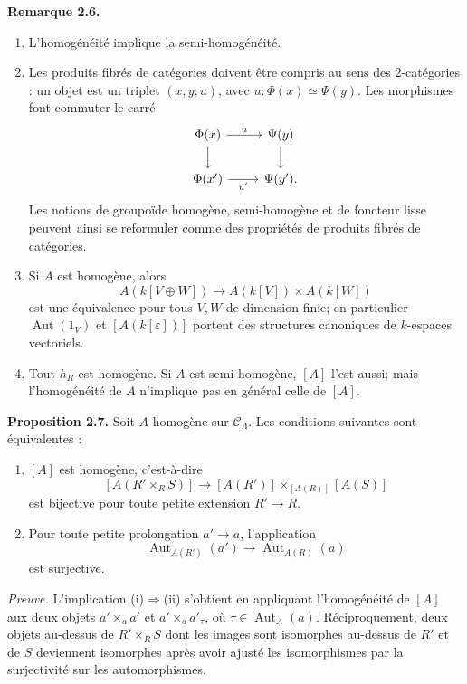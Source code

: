 \documentclass[11pt]{article}
\providecommand{\Aut}{\operatorname{Aut}}
\begin{document}
\textbf{Remarque 2.6.}
\begin{enumerate}[label=(\alph*)]
\item L'homog\'en\'eit\'e implique la semi-homog\'en\'eit\'e.

\item Les produits fibr\'es de cat\'egories doivent \^etre compris au sens des \(2\)-cat\'egories :
un objet est un triplet \((x,y;u)\), avec \(u:\Phi(x)\simeq\Psi(y)\). Les morphismes
font commuter le carr\'e
\[
\begin{tikzcd}
\Phi(x) \arrow[r,"u"] \arrow[d] & \Psi(y) \arrow[d]\\
\Phi(x') \arrow[r,"u'"'] & \Psi(y').
\end{tikzcd}
\]
Les notions de groupo\"ide homog\`ene, semi-homog\`ene et de foncteur lisse peuvent ainsi
se reformuler comme des propri\'et\'es de produits fibr\'es de cat\'egories.

\item Si \(A\) est homog\`ene, alors
\[
 A(k[V\oplus W])\longrightarrow A(k[V])\times A(k[W])
\]
est une \'equivalence pour tous \(V,W\) de dimension finie; en particulier
\(\Aut(1_V)\) et \([A(k[\varepsilon])]\) portent des structures canoniques de
\(k\)-espaces vectoriels.

\item Tout \(h_R\) est homog\`ene. Si \(A\) est semi-homog\`ene, \([A]\) l'est aussi; mais
l'homog\'en\'eit\'e de \(A\) n'implique pas en g\'en\'eral celle de \([A]\).
\end{enumerate}

\textbf{Proposition 2.7.} Soit \(A\) homog\`ene sur \(\mathcal C_\Lambda\). Les conditions
suivantes sont \'equivalentes :
\begin{enumerate}[label=(\roman*)]
\item \([A]\) est homog\`ene, c'est-\`a-dire
\[
 [A(R'\times_R S)]\longrightarrow [A(R')]\times_{[A(R)]}[A(S)]
\]
est bijective pour toute petite extension \(R'\to R\).
\item Pour toute petite prolongation \(a'\to a\), l'application
\[
 \Aut_{A(R')}(a')\longrightarrow \Aut_{A(R)}(a)
\]
est surjective.
\end{enumerate}

\emph{Preuve.} L'implication (i)\(\Rightarrow\)(ii) s'obtient en appliquant l'homog\'en\'eit\'e
de \([A]\) aux deux objets \(a'\times_a a'\) et \(a'\times_a a'_\tau\), o\`u
\(\tau\in\Aut_A(a)\). R\'eciproquement, deux objets au-dessus de \(R'\times_R S\) dont
les images sont isomorphes au-dessus de \(R'\) et de \(S\) deviennent isomorphes apr\`es
avoir ajust\'e les isomorphismes par la surjectivit\'e sur les automorphismes.
\end{document}
